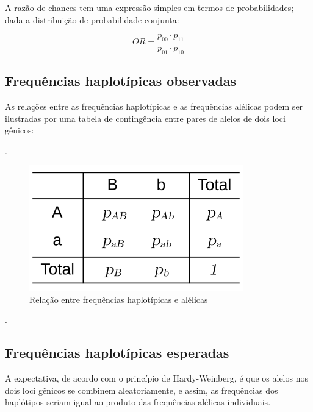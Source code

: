 \documentclass[
]{book}
\begin{document}
A razão de chances tem uma expressão simples em termos de probabilidades; dada a distribuição de probabilidade conjunta:

\begin{equation} 
OR = \frac{p_00\cdot p_11}{p_01\cdot p_10}
  \label{eq:or}
\end{equation}

\hypertarget{frequuxeancias-haplotuxedpicas-observadas}{%
\subsection{Frequências haplotípicas observadas}\label{frequuxeancias-haplotuxedpicas-observadas}}

As relações entre as frequências haplotípicas e as frequências alélicas podem ser ilustradas por uma tabela de contingência entre pares de alelos de dois loci gênicos:

.\linebreak

\begin{figure}

{\centering \includegraphics[width=350px]{figs/freq_haplotipica_observada} 

}

\caption{Relação entre frequências haplotípicas e alélicas}\label{fig:freqhapobs}
\end{figure}

.\linebreak

\hypertarget{frequuxeancias-haplotuxedpicas-esperadas}{%
\subsection{Frequências haplotípicas esperadas}\label{frequuxeancias-haplotuxedpicas-esperadas}}

A expectativa, de acordo com o princípio de Hardy-Weinberg, é que os alelos nos dois loci gênicos se combinem aleatoriamente, e assim, as frequências dos haplótipos seriam igual ao produto das frequências alélicas individuais.
\end{document}
